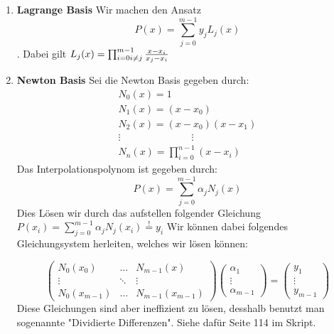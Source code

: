 \documentclass{sciposter}
\begin{document}
\begin{multicols}{3}
\begin{enumerate}
	\item \textbf{Lagrange Basis}
Wir machen den Ansatz $$P(x) = \sum_{j=0}^{m-1} y_j L_j (x)$$. Dabei gilt $L_j (x) = \prod_{i=0 \\ i \neq j}^{m-1} \frac{x-x_i}{x_j - x_i}$

	\item \textbf{Newton Basis}
	Sei die Newton Basis gegeben durch: 
	$$\begin{matrix}
	N_0 (x) = 1\\
	N_1 (x) = (x-x_0)\\
	N_2 (x) = (x-x_0)(x-x_1)\\
	\vdots \hspace{3cm} \vdots \\
	N_n (x) = \prod_{i=0}^{n-1} (x-x_i)
	\end{matrix}$$
Das Interpolationspolynom ist gegeben durch: $$P(x) = \sum_{j=0}^{m-1} \alpha_j N_j (x)$$
Dies Lösen wir durch das aufstellen folgender Gleichung $P(x_i) = \sum_{j=0}^{m-1}\alpha_j N_j(x_i) \overset{!}{=} y_i$ Wir können dabei folgendes Gleichungsystem herleiten, welches wir lösen können:

\begin{equation*}
\begin{pmatrix}
N_0 (x_0) & \dots & N_{m-1}(x)\\
\vdots & \ddots & \vdots\\
N_0(x_{m-1}) & \dots & N_{m-1}(x_{m-1})
\end{pmatrix}
\begin{pmatrix}
\alpha_1 \\
\vdots\\
\alpha_{m-1}
\end{pmatrix}
=
\begin{pmatrix}
y_1 \\
\vdots\\
y_{m-1}
\end{pmatrix}
\end{equation*}
Diese Gleichungen sind aber ineffizient zu lösen, desshalb benutzt man sogenannte "Dividierte Differenzen". Siehe dafür Seite 114 im Skript.


\end{enumerate}


\end{multicols}
\end{document}
